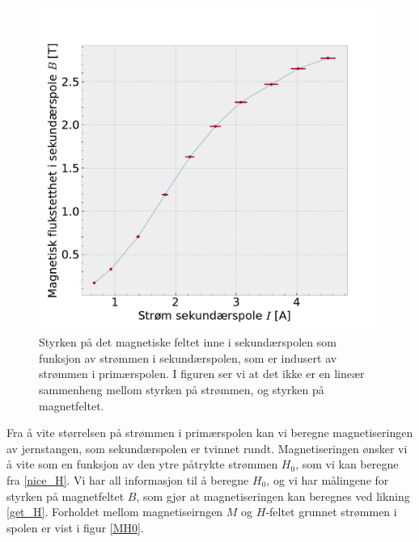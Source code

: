 \documentclass[%
 reprint,
 amsmath,amssymb,
 aps,
 norsk,
]{revtex4-1}
\begin{document}
\begin{figure}[h!]
  \centering
  \includegraphics[scale=0.45]{magnetic_secondary_hysterese.pdf}
  \caption{Styrken på det magnetiske feltet inne i sekundærspolen som funksjon av strømmen i sekundærspolen, som er indusert av strømmen i primærspolen. I figuren ser vi at det ikke er en lineær sammenheng mellom styrken på strømmen, og styrken på magnetfeltet.}
  \label{data_delta_B}
\end{figure}
Fra å vite størrelsen på strømmen i primærspolen kan vi beregne magnetiseringen av jernstangen, som sekundærspolen er tvinnet rundt. Magnetiseringen ønsker vi å vite som en funksjon av den ytre påtrykte strømmen $H_0$, som vi kan beregne fra \eqref{nice_H}. Vi har all informasjon til å beregne $H_0$, og vi har målingene for styrken på magnetfeltet $B$, som gjør at magnetiseringen kan beregnes ved likning \eqref{get_H}. Forholdet mellom magnetiseirngen $M$ og $H$-feltet grunnet strømmen i spolen er vist i figur \vref{MH0}.
\end{document}
